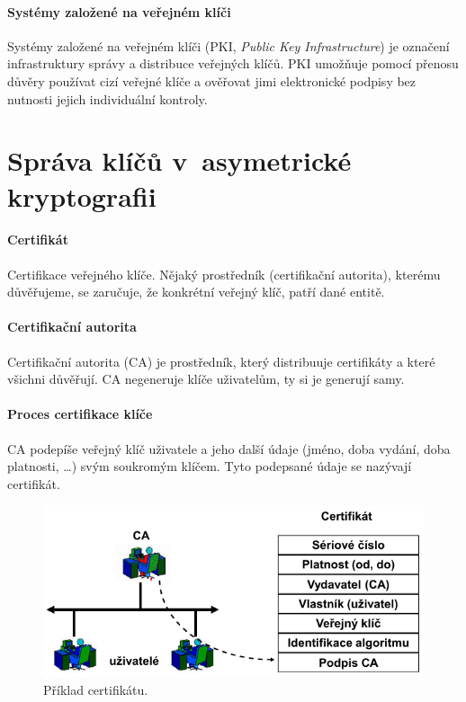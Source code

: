 \paragraph*{Systémy založené na veřejném klíči} Systémy založené na veřejném klíči (PKI, \textit{Public Key Infrastructure}) je označení infrastruktury správy a distribuce veřejných klíčů. PKI umožňuje pomocí přenosu důvěry používat cizí veřejné klíče a ověřovat jimi elektronické podpisy bez nutnosti jejich individuální kontroly.


\section{Správa klíčů v~asymetrické kryptografii}

\paragraph*{Certifikát} Certifikace veřejného klíče. Nějaký prostředník (certifikační autorita), kterému důvěřujeme, se zaručuje, že konkrétní veřejný klíč, patří dané entitě.

\paragraph*{Certifikační autorita} Certifikační autorita (CA) je prostředník, který distribuuje certifikáty a které všichni důvěřují. CA negeneruje klíče uživatelům, ty si je generují samy.

\paragraph*{Proces certifikace klíče} CA podepíše veřejný klíč uživatele a jeho další údaje (jméno, doba vydání, doba platnosti, \dots) svým soukromým klíčem. Tyto podepsané údaje se nazývají certifikát.

\begin{figure}[H]
    \centering
    \includegraphics[width=0.65\linewidth]{certifikat.pdf}
    \caption{Příklad certifikátu.}
\end{figure}

